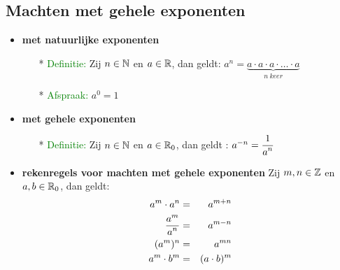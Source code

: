 \subsection{Machten met gehele exponenten} \label{machten_geheel}
\hypertarget{machten_geheel}{}
\begin{itemize}%
\item {\bf met natuurlijke exponenten}
\begin{itemize}%
\item[*] \textcolor{green}{Definitie:} Zij $n \in \mathbb{N}$ en $a\in\mathbb{R}$, dan geldt: $a^n=\underbrace{a\cdot a\cdot a\cdot\ldots\cdot a}_{n\: keer}$
\item[*] \textcolor{green}{Afspraak:} $a^0=1$
\end{itemize}%
\item {\bf met gehele exponenten}
\begin{itemize}%
\item[*] \textcolor{green}{Definitie:} Zij $n \in \mathbb{N}$ en $a \in \mathbb{R}_0$, dan geldt : $a^{-n}=\displaystyle\frac{\displaystyle 1}{\displaystyle a^n}$
\end{itemize}%
\item {\bf rekenregels voor machten met gehele exponenten}\newline
Zij $m, n \in \mathbb{Z}$ en $a, b \in \mathbb{R}_0$, dan geldt: \newline
\begin{eqnarray*}
a^m\cdot a^n & = & a^{m+n}\\
\displaystyle\frac{\displaystyle a^m}{\displaystyle a^n} & = & a^{m-n}\\
(a^m)^n & = & a^{mn}\\
a^m\cdot b^m & = & (a\cdot b)^m
\end{eqnarray*}
\end{itemize}%

